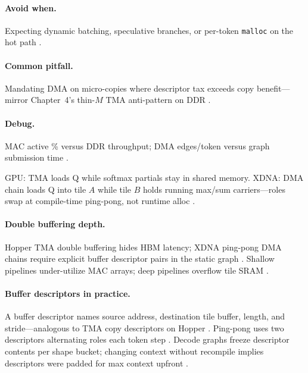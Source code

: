 \paragraph{Avoid when.}
Expecting dynamic batching, speculative branches, or per-token \texttt{malloc} on the hot path \citep{patel2025llminference,liu2024deepseekv3}.

\paragraph{Common pitfall.}
Mandating DMA on micro-copies where descriptor tax exceeds copy benefit---mirror Chapter~4's thin-$M$ TMA anti-pattern on DDR \citep{taxbreak2026,yirage2026}.

\paragraph{Debug.}
MAC active \% versus DDR throughput; DMA edges/token versus graph submission time \citep{amd2024aie,patel2025llminference}.

\begin{example}
GPU: TMA loads Q while softmax partials stay in shared memory.
XDNA: DMA chain loads Q into tile $A$ while tile $B$ holds running max/sum carriers---roles swap at compile-time ping-pong, not runtime alloc \citep{yirage2026,dao2022flashattention}.
\end{example}

\paragraph{Double buffering depth.}
Hopper TMA double buffering hides HBM latency; XDNA ping-pong DMA chains require explicit buffer descriptor pairs in the static graph \citep{semianalysis2024tma,nvidia2022hopper,amd2024aie,yirage2026}.
Shallow pipelines under-utilize MAC arrays; deep pipelines overflow tile SRAM \citep{memoryfloor2026,patel2025llminference}.

\paragraph{Buffer descriptors in practice.}
A buffer descriptor names source address, destination tile buffer, length, and stride---analogous to TMA copy descriptors on Hopper \citep{nvidia2022hopper,amd2024xdna}.
Ping-pong uses two descriptors alternating roles each token step \citep{yirage2026,kwon2023vllm}.
Decode graphs freeze descriptor contents per shape bucket; changing context without recompile implies descriptors were padded for max context upfront \citep{patel2025llminference,amd2024aie}.

